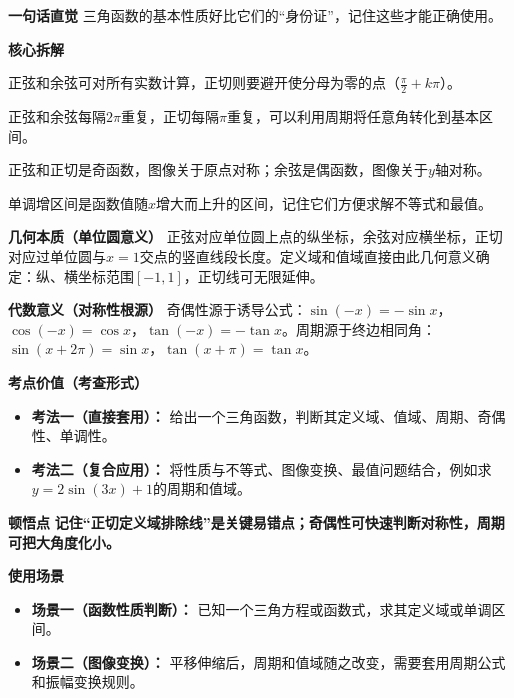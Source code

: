 \begin{explanationbox}
	\textbf{\textcolor{CExplanation}{一句话直觉}}
	三角函数的基本性质好比它们的“身份证”，记住这些才能正确使用。

	\medskip
	\textbf{\textcolor{CExplanation}{核心拆解}}
	\begin{description}[style=nextline, leftmargin=2.8em, labelsep=0.5em, itemsep=0.45em]
		\item[\textbf{要点一（定义域限制）：}]
			正弦和余弦可对所有实数计算，正切则要避开使分母为零的点（$\frac{\pi}{2}+k\pi$）。
		\item[\textbf{要点二（周期规律）：}]
			正弦和余弦每隔$2\pi$重复，正切每隔$\pi$重复，可以利用周期将任意角转化到基本区间。
		\item[\textbf{要点三（奇偶对称）：}]
			正弦和正切是奇函数，图像关于原点对称；余弦是偶函数，图像关于$y$轴对称。
		\item[\textbf{要点四（单调区间）：}]
			单调增区间是函数值随$x$增大而上升的区间，记住它们方便求解不等式和最值。
	\end{description}

	\medskip
	\textbf{\textcolor{CExplanation}{几何本质（单位圆意义）}}
	正弦对应单位圆上点的纵坐标，余弦对应横坐标，正切对应过单位圆与$x=1$交点的竖直线段长度。定义域和值域直接由此几何意义确定：纵、横坐标范围$[-1,1]$，正切线可无限延伸。

	\medskip
	\textbf{\textcolor{CExplanation}{代数意义（对称性根源）}}
	奇偶性源于诱导公式：$\sin(-x)=-\sin x$，$\cos(-x)=\cos x$，$\tan(-x)=-\tan x$。周期源于终边相同角：$\sin(x+2\pi)=\sin x$，$\tan(x+\pi)=\tan x$。

	\medskip
	\textbf{\textcolor{CExplanation}{考点价值（考查形式）}}
	\begin{itemize}[leftmargin=*, itemsep=0.5em, topsep=0.4em]
		\item \textbf{考法一（直接套用）：} 给出一个三角函数，判断其定义域、值域、周期、奇偶性、单调性。
		\item \textbf{考法二（复合应用）：} 将性质与不等式、图像变换、最值问题结合，例如求$y=2\sin(3x)+1$的周期和值域。
	\end{itemize}

	\medskip
	\textbf{\textcolor{CExplanation}{顿悟点}}
	\textbf{记住“正切定义域排除线”是关键易错点；奇偶性可快速判断对称性，周期可把大角度化小。}

	\medskip
	\textbf{\textcolor{CExplanation}{使用场景}}
	\begin{itemize}[leftmargin=*, itemsep=0.5em, topsep=0.4em]
		\item \textbf{场景一（函数性质判断）：} 已知一个三角方程或函数式，求其定义域或单调区间。
		\item \textbf{场景二（图像变换）：} 平移伸缩后，周期和值域随之改变，需要套用周期公式和振幅变换规则。
	\end{itemize}

\end{explanationbox}
